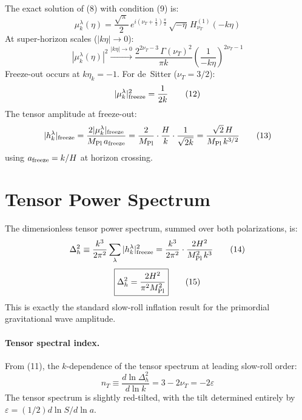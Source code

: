 \documentclass[12pt,a4paper]{article}
\begin{document}
The exact solution of (8) with condition (9) is:
\begin{equation}
\mu_k^\lambda(\eta) = \frac{\sqrt{\pi}}{2}\,e^{i(\nu_T + \tfrac{1}{2})\frac{\pi}{2}}\,\sqrt{-\eta}\,H_{\nu_T}^{(1)}(-k\eta) \tag{10}
\end{equation}
At super-horizon scales ($|k\eta| \to 0$):
\begin{equation}
|\mu_k^\lambda(\eta)|^2 \xrightarrow{|k\eta|\to 0} \frac{2^{2\nu_T - 3}\,\Gamma(\nu_T)^2}{\pi k}\left(\frac{1}{-k\eta}\right)^{2\nu_T - 1} \tag{11}
\end{equation}
Freeze-out occurs at $k\eta_k = -1$. For de~Sitter ($\nu_T = 3/2$):
\begin{equation}
|\mu_k^\lambda|_{\rm freeze}^2 = \frac{1}{2k} \tag{12}
\end{equation}
The tensor amplitude at freeze-out:
\begin{equation}
|h_k^\lambda|_{\rm freeze} = \frac{2|\mu_k^\lambda|_{\rm freeze}}{M_{\rm Pl}\,a_{\rm freeze}} = \frac{2}{M_{\rm Pl}}\cdot\frac{H}{k}\cdot\frac{1}{\sqrt{2k}} = \frac{\sqrt{2}\,H}{M_{\rm Pl}\,k^{3/2}} \tag{13}
\end{equation}
using $a_{\rm freeze} = k/H$ at horizon crossing.

\section{Tensor Power Spectrum}

The dimensionless tensor power spectrum, summed over both polarizations, is:
\begin{equation}
\Delta_h^2 \equiv \frac{k^3}{2\pi^2}\sum_\lambda |h_k^\lambda|_{\rm freeze}^2 = \frac{k^3}{2\pi^2}\cdot\frac{2H^2}{M_{\rm Pl}^2\,k^3} \tag{14}
\end{equation}
\begin{equation}
\boxed{\Delta_h^2 = \frac{2H^2}{\pi^2 M_{\rm Pl}^2}} \tag{15}
\end{equation}
This is exactly the standard slow-roll inflation result for the primordial gravitational wave amplitude.

\paragraph{Tensor spectral index.}
From (11), the $k$-dependence of the tensor spectrum at leading slow-roll order:
\begin{equation}
n_T \equiv \frac{d\ln\Delta_h^2}{d\ln k} = 3 - 2\nu_T = -2\varepsilon \tag{16}
\end{equation}
The tensor spectrum is slightly red-tilted, with the tilt determined entirely by $\varepsilon = (1/2)d\ln S/d\ln a$.
\end{document}
